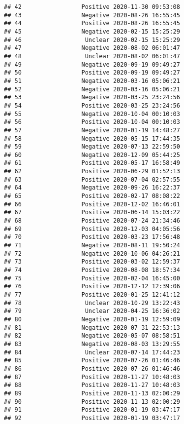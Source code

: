 \documentclass[
]{article}
\begin{document}
\begin{verbatim}
## 42                 Positive 2020-11-30 09:53:08
## 43                 Negative 2020-08-26 16:55:45
## 44                 Positive 2020-08-26 16:55:45
## 45                 Negative 2020-02-15 15:25:29
## 46                  Unclear 2020-02-15 15:25:29
## 47                 Negative 2020-08-02 06:01:47
## 48                  Unclear 2020-08-02 06:01:47
## 49                 Negative 2020-09-19 09:49:27
## 50                 Positive 2020-09-19 09:49:27
## 51                 Negative 2020-03-16 05:06:21
## 52                 Negative 2020-03-16 05:06:21
## 53                 Negative 2020-03-25 23:24:56
## 54                 Positive 2020-03-25 23:24:56
## 55                 Negative 2020-10-04 00:10:03
## 56                 Positive 2020-10-04 00:10:03
## 57                 Negative 2020-01-19 14:48:27
## 58                 Negative 2020-05-15 17:44:35
## 59                 Negative 2020-07-13 22:59:50
## 60                 Negative 2020-12-09 05:44:25
## 61                 Positive 2020-05-17 16:58:49
## 62                 Positive 2020-06-29 01:52:13
## 63                 Positive 2020-07-04 02:57:55
## 64                 Negative 2020-09-26 16:22:37
## 65                 Positive 2020-02-17 08:08:22
## 66                 Positive 2020-12-02 16:46:01
## 67                 Positive 2020-06-14 15:03:22
## 68                 Positive 2020-07-24 21:34:46
## 69                 Positive 2020-12-03 04:05:56
## 70                 Positive 2020-03-23 17:56:48
## 71                 Negative 2020-08-11 19:50:24
## 72                 Negative 2020-10-06 04:26:21
## 73                 Positive 2020-03-02 12:59:37
## 74                 Positive 2020-08-08 18:57:34
## 75                 Positive 2020-02-04 16:45:00
## 76                 Positive 2020-12-12 12:39:06
## 77                 Positive 2020-01-25 12:41:12
## 78                  Unclear 2020-10-29 13:22:43
## 79                  Unclear 2020-04-25 16:36:02
## 80                 Negative 2020-01-19 12:59:09
## 81                 Negative 2020-07-31 22:53:13
## 82                 Negative 2020-05-07 08:58:51
## 83                 Negative 2020-08-03 13:29:55
## 84                  Unclear 2020-07-14 17:44:23
## 85                 Positive 2020-07-26 01:46:46
## 86                 Positive 2020-07-26 01:46:46
## 87                 Positive 2020-11-27 10:48:03
## 88                 Positive 2020-11-27 10:48:03
## 89                 Positive 2020-11-13 02:00:29
## 90                 Positive 2020-11-13 02:00:29
## 91                 Positive 2020-01-19 03:47:17
## 92                 Positive 2020-01-19 03:47:17

\end{verbatim}
\end{document}
